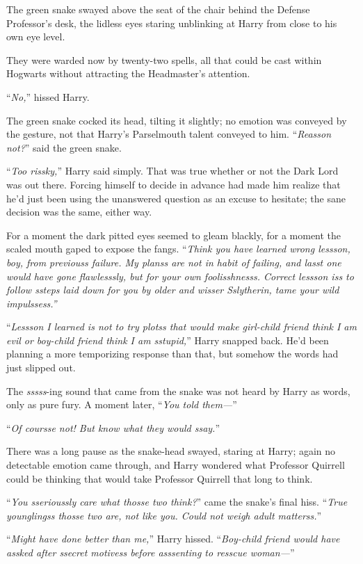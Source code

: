 The green snake swayed above the seat of the chair behind the Defense Professor’s desk, the lidless eyes staring unblinking at Harry from close to his own eye level.

They were warded now by twenty-two spells, all that could be cast within Hogwarts without attracting the Headmaster’s attention.

“\emph{No,}” hissed Harry.

The green snake cocked its head, tilting it slightly; no emotion was conveyed by the gesture, not that Harry’s Parselmouth talent conveyed to him. “\emph{Reasson not?}” said the green snake.

“\emph{Too rissky,}” Harry said simply. That was true whether or not the Dark Lord was out there. Forcing himself to decide in advance had made him realize that he’d just been using the unanswered question as an excuse to hesitate; the sane decision was the same, either way.

For a moment the dark pitted eyes seemed to gleam blackly, for a moment the scaled mouth gaped to expose the fangs. “\emph{Think you have learned wrong lessson, boy, from previouss failure. My planss are not in habit of failing, and lasst one would have gone flawlesssly, but for your own foolisshnesss. Correct lessson iss to follow ssteps laid down for you by older and wisser Sslytherin, tame your wild impulssess.”}

“\emph{Lessson I learned is not to try plotss that would make girl-child friend think I am evil or boy-child friend think I am sstupid,}” Harry snapped back. He’d been planning a more temporizing response than that, but somehow the words had just slipped out.

The \emph{sssss}-ing sound that came from the snake was not heard by Harry as words, only as pure fury. A moment later, “\emph{You told them—}”

“\emph{Of coursse not! But know what they would ssay.}”

There was a long pause as the snake-head swayed, staring at Harry; again no detectable emotion came through, and Harry wondered what Professor Quirrell could be thinking that would take Professor Quirrell that long to think.

“\emph{You sserioussly care what thosse two think?}” came the snake’s final hiss. “\emph{True younglingss thosse two are, not like you. Could not weigh adult matterss.}”

“\emph{Might have done better than me,}” Harry hissed. “\emph{Boy-child friend would have assked after ssecret motivess before asssenting to resscue woman—}”

